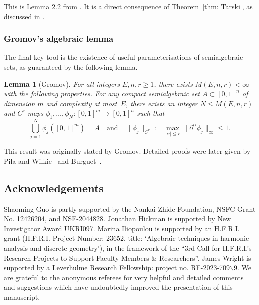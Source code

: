 \documentclass[reqno]{amsart}
\numberwithin{equation}{section}
\theoremstyle{plain}
\newtheorem{lemma}[theorem]{Lemma}
\theoremstyle{definition}
\begin{document}
This is Lemma 2.2 from \cite{KR2018}. It is a direct consequence of Theorem~\ref{thm: Tarski}, as discussed in \cite{KR2018}. 

\subsubsection*{Gromov's algebraic lemma} The final key tool is the existence of useful parameterisations of semialgebraic sets, as guaranteed by the following lemma. 

\begin{lemma}[Gromov]\label{lem: Gromov} For all integers $E, n, r \geq 1$, there exists $M(E, n, r) < \infty$ with the following
properties. For any compact semialgebraic  set $A \subset [0,1]^n$ of dimension $m$ and complexity at most~$E$, there exists
an integer $N\le M(E,n,r)$ and $C^r$ maps $\phi_1,\dots,\phi_N: [0,1]^m \longrightarrow [0,1]^n$ such that
$$\bigcup_{j=1}^N  \phi_j ([0,1]^m) =A\quad \text{and}\quad \|\phi_j\|_{C^r}:=\max_{|\alpha|\le r}\|\partial^\alpha\phi_j\|_{\infty} \leq 1.$$
\end{lemma}

 This result was originally stated by Gromov. Detailed proofs were later given by Pila and Wilkie~\cite{PW2006} and Burguet~\cite{Burguet2008}.\\



\subsection*{Acknowledgements} 


Shaoming Guo is partly supported by the Nankai Zhide Foundation, NSFC Grant No. 12426204, and NSF-2044828. Jonathan Hickman is supported by New Investigator Award UKRI097. Marina Iliopoulou is supported by an H.F.R.I. grant (H.F.R.I. Project Number: 23652, title: `Algebraic techniques in harmonic analysis and discrete geometry'), in the framework of the “3rd
Call for H.F.R.I.’s Research Projects to Support Faculty Members \& Researchers”. James Wright is supported by a Leverhulme Research Fellowship: project no. RF-2023-709$\backslash$9. We are grateful to the anonymous referees for very helpful and detailed comments and suggestions which have undoubtedly improved the presentation of this manuscript.  



















\end{document}
